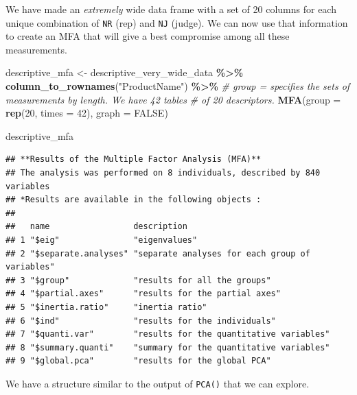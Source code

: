 \documentclass[
]{book}
\newenvironment{Shaded}{\begin{snugshade}}{\end{snugshade}}
\newcommand{\AttributeTok}[1]{\textcolor[rgb]{0.13,0.29,0.53}{#1}}
\newcommand{\CommentTok}[1]{\textcolor[rgb]{0.56,0.35,0.01}{\textit{#1}}}
\newcommand{\ConstantTok}[1]{\textcolor[rgb]{0.56,0.35,0.01}{#1}}
\newcommand{\DecValTok}[1]{\textcolor[rgb]{0.00,0.00,0.81}{#1}}
\newcommand{\FunctionTok}[1]{\textcolor[rgb]{0.13,0.29,0.53}{\textbf{#1}}}
\newcommand{\NormalTok}[1]{#1}
\newcommand{\OtherTok}[1]{\textcolor[rgb]{0.56,0.35,0.01}{#1}}
\newcommand{\SpecialCharTok}[1]{\textcolor[rgb]{0.81,0.36,0.00}{\textbf{#1}}}
\newcommand{\StringTok}[1]{\textcolor[rgb]{0.31,0.60,0.02}{#1}}
\begin{document}
We have made an \emph{extremely} wide data frame with a set of 20 columns for each unique combination of \texttt{NR} (rep) and \texttt{NJ} (judge). We can now use that information to create an MFA that will give a best compromise among all these measurements.

\begin{Shaded}
\begin{Highlighting}[]
\NormalTok{descriptive\_mfa }\OtherTok{\textless{}{-}}\NormalTok{ descriptive\_very\_wide\_data }\SpecialCharTok{\%\textgreater{}\%}
  \FunctionTok{column\_to\_rownames}\NormalTok{(}\StringTok{"ProductName"}\NormalTok{) }\SpecialCharTok{\%\textgreater{}\%}
  \CommentTok{\# \textasciigrave{}group = \textasciigrave{} specifies the sets of measurements by length.  We have 42 tables}
  \CommentTok{\# of 20 descriptors.}
  \FunctionTok{MFA}\NormalTok{(}\AttributeTok{group =} \FunctionTok{rep}\NormalTok{(}\DecValTok{20}\NormalTok{, }\AttributeTok{times =} \DecValTok{42}\NormalTok{), }\AttributeTok{graph =} \ConstantTok{FALSE}\NormalTok{)}

\NormalTok{descriptive\_mfa}
\end{Highlighting}
\end{Shaded}

\begin{verbatim}
## **Results of the Multiple Factor Analysis (MFA)**
## The analysis was performed on 8 individuals, described by 840 variables
## *Results are available in the following objects :
## 
##   name                 description                                    
## 1 "$eig"               "eigenvalues"                                  
## 2 "$separate.analyses" "separate analyses for each group of variables"
## 3 "$group"             "results for all the groups"                   
## 4 "$partial.axes"      "results for the partial axes"                 
## 5 "$inertia.ratio"     "inertia ratio"                                
## 6 "$ind"               "results for the individuals"                  
## 7 "$quanti.var"        "results for the quantitative variables"       
## 8 "$summary.quanti"    "summary for the quantitative variables"       
## 9 "$global.pca"        "results for the global PCA"
\end{verbatim}

We have a structure similar to the output of \texttt{PCA()} that we can explore.

\begin{Shaded}
\end{Shaded}
\end{document}
